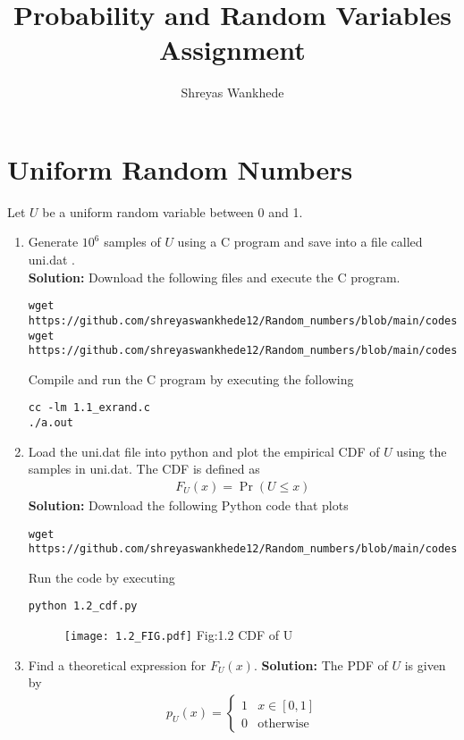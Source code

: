 \documentclass[journal,12pt,twocolumn]{IEEEtran}
\renewcommand\thesection{\arabic{section}}
\providecommand{\pr}[1]{\ensuremath{\Pr\left(#1\right)}}
\theoremstyle{remark}
\newcommand{\solution}{\noindent \textbf{Solution: }}
\numberwithin{equation}{section}
\begin{document}
\title{Probability and Random Variables\\Assignment}
\author{Shreyas Wankhede}
\maketitle

\section{Uniform Random Numbers}
Let $U$ be a uniform random variable between 0 and 1.
\begin{enumerate}[label=\thesection.\arabic*
,ref=\thesection.\theenumi]
\item Generate $10^6$ samples of $U$ using a C program and save into a file called uni.dat .
\\
\solution Download the following files and execute the  C program.
\begin{lstlisting}
wget https://github.com/shreyaswankhede12/Random_numbers/blob/main/codes/1.1_exrand.
wget https://github.com/shreyaswankhede12/Random_numbers/blob/main/codes/coeffs.h
\end{lstlisting}
Compile and run the C program by executing the following
\begin{lstlisting}
cc -lm 1.1_exrand.c
./a.out
\end{lstlisting}
%
\item
Load the uni.dat file into python and plot the empirical CDF of $U$ using the samples in uni.dat. The CDF is defined as
\begin{align}
F_{U}(x) = \pr{U \le x}
\end{align}
\solution  Download the following Python code that plots
\begin{lstlisting}
wget https://github.com/shreyaswankhede12/Random_numbers/blob/main/codes/1.2_cdf.py
\end{lstlisting}
Run the code by executing
\begin{lstlisting}
python 1.2_cdf.py
\end{lstlisting}
\begin{figure}
\centering
\texttt{[image: 1.2\_FIG.pdf]}
Fig:1.2 CDF of U
\end{figure}
%
\item
Find a  theoretical expression for $F_{U}(x)$.
\solution The PDF of $U$ is given by
	\begin{align}
		p_{U}(x) = 
		\begin{cases}
			1 & x \in [0, 1] \\
			0 & \text{otherwise}
		\end{cases}
	\end{align}
	

\end{enumerate}
\end{document}
